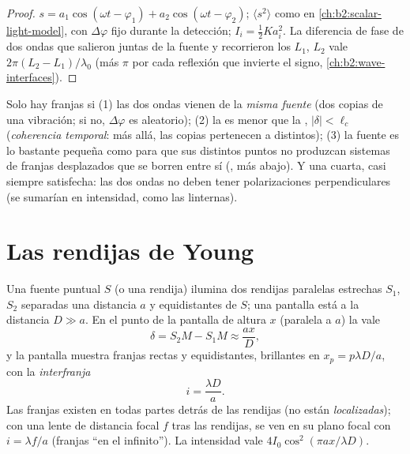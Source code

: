 \begin{proof}
$s = a_1\cos(\omega t - \varphi_1) + a_2\cos(\omega t - \varphi_2)$; $\langle s^2\rangle$ como en
\cref{ch:b2:scalar-light-model}, con $\Delta\varphi$ fijo durante la
detección; $I_i = \tfrac12Ka_i^2$. La diferencia de fase de dos ondas
que salieron juntas de la fuente y recorrieron los  $L_1$, $L_2$ vale
$2\pi(L_2 - L_1)/\lambda_0$ (más $\pi$ por cada reflexión que invierte el
signo, \cref{ch:b2:wave-interfaces}).
\end{proof}

\begin{remark}\label{rem:b2:two-wave-interference:conditions}
Solo hay franjas si (1) las dos ondas vienen de la \emph{misma
fuente} (dos copias de una vibración; si no, $\Delta\varphi$ es aleatorio); (2)
la  es menor que la , $|\delta| < \ell_c$
(\emph{coherencia temporal}: más allá, las copias pertenecen a  distintos); (3) la fuente es lo bastante pequeña como para que sus distintos puntos
no produzcan sistemas de franjas desplazados que se borren entre sí
(\emph{}, más abajo). Y una cuarta, casi siempre satisfecha: las
dos ondas no deben tener polarizaciones perpendiculares (se sumarían
en intensidad, como las linternas).
\end{remark}

\section{Las rendijas de Young}

\begin{proposition}\label{prop:b2:two-wave-interference:young}
Una fuente puntual $S$ (o una rendija) ilumina dos rendijas paralelas estrechas
$S_1$, $S_2$ separadas una distancia $a$ y equidistantes de $S$; una pantalla está a
la distancia $D \gg a$. En el punto de la pantalla de altura $x$ (paralela
a $a$) la  vale
\[
\delta = S_2M - S_1M \approx \frac{ax}D ,
\]
y la pantalla muestra franjas rectas y equidistantes, brillantes en $x_p =
p\lambda D/a$, con la \emph{interfranja}
\[
i = \frac{\lambda D}a .
\]
Las franjas existen en todas partes detrás de las rendijas (no están
\emph{localizadas}); con una lente de distancia focal $f$ tras las rendijas, se
ven en su plano focal con $i = \lambda f/a$ (franjas ``en el infinito'').
La intensidad vale $4I_0\cos^2(\pi ax/\lambda D)$.
\end{proposition}

